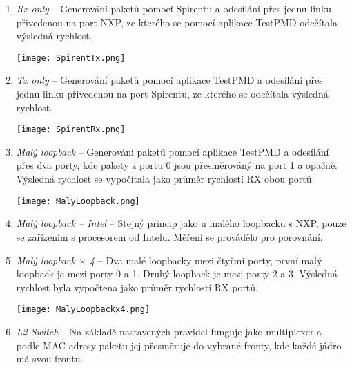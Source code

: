\documentclass[11pt, titlepage, a4paper]{article}
\begin{document}
		\begin{enumerate}

		\item \textit{Rx only} -- Generování paketů pomocí Spirentu a odesílání přes jednu linku přivedenou na port NXP, ze kterého se pomocí aplikace TestPMD odečítala výsledná rychlost.
		\begin{center}
		\texttt{[image: SpirentTx.png]}
		\end{center}


		\item \textit{Tx only} -- Generování paketů pomocí aplikace TestPMD a odesílání přes jednu linku přivedenou na port Spirentu, ze kterého se odečítala výsledná rychlost.
		\begin{center}
		\texttt{[image: SpirentRx.png]}
		\end{center}


		\item \textit{Malý loopback} -- Generování paketů pomocí aplikace TestPMD a odesílání přes dva porty, kde pakety z portu 0 jsou přesměrováný na port 1 a opačně. Výsledná rychlost se vypočítala jako průměr rychlostí RX obou portů.
		\begin{center}
		\texttt{[image: MalyLoopback.png]}
		\end{center}

		\item \textit{Malý loopback -- Intel} -- Stejný princip jako u malého loopbacku s NXP, pouze se zařízením s procesorem od Intelu. Měření se provádělo pro porovnání.

		\item \textit{Malý loopback $\times$ 4} -- Dva malé loopbacky mezi čtyřmi porty, první malý loopback je mezi porty 0 a 1. Druhý loopback je mezi porty 2 a 3. Výsledná rychlost byla vypočtena jako průměr rychlostí RX portů.
		\begin{center}
		\texttt{[image: MalyLoopbackx4.png]}
		\end{center}

		\item \textit{L2 Switch} -- Na základě nastavených pravidel funguje jako multiplexer a podle MAC adresy paketu jej přesměruje do vybrané fronty, kde každé jádro má svou frontu.

		\end{enumerate}
\end{document}
